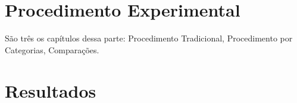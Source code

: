 \documentclass[
	12pt,				%
	openright,			%
	twoside,			%
	a4paper,			%
	english,			%
	brazil,				%
	]{abntex2}
\begin{document}
\part{Procedimento Experimental}

São três os capítulos dessa parte: Procedimento Tradicional, Procedimento por Categorias, Comparações.


%
%

% 

%

\part{Resultados}
\end{document}
